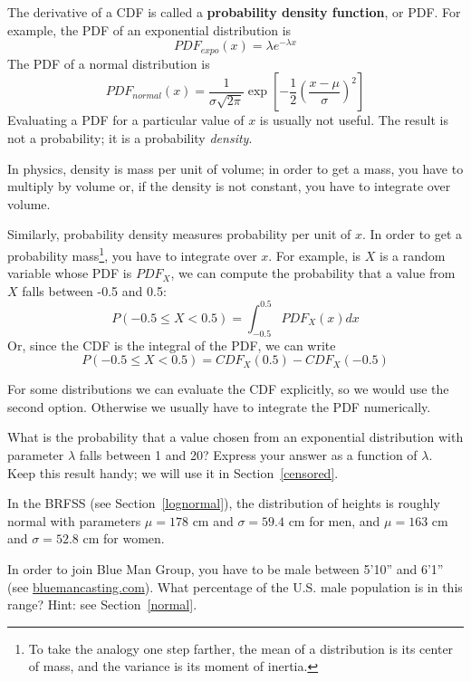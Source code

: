 \documentclass[12pt]{book}
\begin{document}

The derivative of a CDF is called a {\bf probability density function},
or PDF.  For example, the PDF of an exponential distribution is
%
\[ PDF_{expo}(x) = \lambda e^{-\lambda x}   \]
%
The PDF of a normal distribution is
%
\[ PDF_{normal}(x) = \frac{1}{\sigma \sqrt{2 \pi}} 
                 \exp \left[ -\frac{1}{2} 
                 \left( \frac{x - \mu}{\sigma} \right)^2 \right]  \]
%
Evaluating a PDF for a particular value of $x$ is usually not useful.
The result is not a probability; it is a probability {\em density}.


In physics, density is mass per unit of
volume; in order to get a mass, you have to multiply by volume or,
if the density is not constant, you have to integrate over volume.


Similarly, probability density measures probability per unit of $x$.
In order to get a probability mass\footnote{To take the analogy one
step farther, the mean of a distribution is its center of mass, and
the variance is its moment of inertia.}, you have to integrate over $x$.
For example, is $X$ is a random variable whose PDF is $PDF_X$, we
can compute the probability that a value from $X$
falls between -0.5 and 0.5:
%
\[ P(-0.5 \le X < 0.5) = \int_{-0.5}^{0.5} PDF_{X}(x) dx \]
%
Or, since the CDF is the integral of the PDF, we can write
%
\[ P(-0.5 \le X < 0.5) = CDF_{X}(0.5) - CDF_{X}(-0.5) \]

For some distributions we can evaluate the CDF explicitly, so we would
use the second option.  Otherwise we usually have to integrate the
PDF numerically.

\begin{exercise}
\label{expo_pdf}
What is the probability that a value chosen from an exponential
distribution with parameter $\lambda$ falls between 1 and 20?  Express
your answer as a function of $\lambda$.  Keep this result handy;
we will use it in Section~\ref{censored}.


\end{exercise}


\begin{exercise}
In the BRFSS (see Section~\ref{lognormal}), the distribution of
heights is roughly normal with parameters $\mu=178$ cm and
$\sigma=59.4$ cm for men, and $\mu=163$ cm and $\sigma=52.8$ cm for
women.



In order to join Blue Man Group, you have to be male between 5'10''
and 6'1'' (see \url{bluemancasting.com}).  What percentage of the
U.S. male population is in this range?  Hint: see
Section~\ref{normal}.

\end{exercise}
\end{document}
